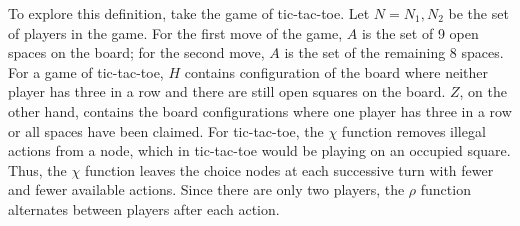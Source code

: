 To explore this definition, take the game of tic-tac-toe. Let $N={N_1, N_2}$ be the set of players in the game. For the first move of the game, $A$ is the set of 9 open spaces on the board; for the second move, $A$ is the set of the remaining 8 spaces. For a game of tic-tac-toe, $H$ contains configuration of the board where neither player has three in a row and there are still open squares on the board. $Z$, on the other hand, contains the board configurations where one player has three in a row or all spaces have been claimed. For tic-tac-toe, the $\chi$ function removes illegal actions from a node, which in tic-tac-toe would be playing on an occupied square. Thus, the $\chi$ function leaves the choice nodes at each successive turn with fewer and fewer available actions. Since there are only two players, the $\rho$ function alternates between players after each action.